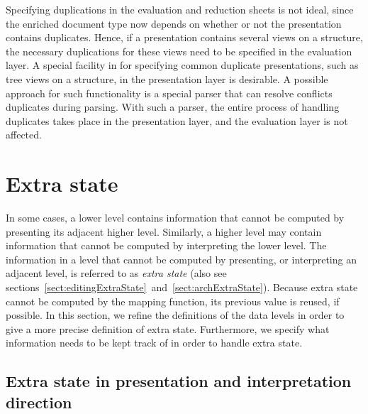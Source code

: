 Specifying duplications in the evaluation and reduction sheets is not ideal, since the enriched document type now depends on whether or not the presentation contains duplicates. Hence, if a presentation contains several views on a structure, the necessary duplications for these views need to be specified in the evaluation layer. A special facility in for specifying common duplicate presentations, such as tree views on a structure, in the presentation layer is desirable. A possible approach for such functionality is a special parser that can resolve conflicts duplicates during parsing. With such a parser, the entire process of handling duplicates takes place in the presentation layer, and the evaluation layer is not affected. 

%																
%																
%																
\section{Extra state} \label{sect:extraState}



In some cases, a lower level contains information that cannot be computed by presenting its adjacent higher level. Similarly, a higher level may contain information that cannot be computed by interpreting the lower level. The information in a level that cannot be computed by presenting, or interpreting an adjacent level, is referred to as {\em extra state} (also see sections~\ref{sect:editingExtraState}~and~\ref{sect:archExtraState}). Because extra state cannot be computed by the mapping function, its previous value is reused, if possible. In this section, we refine the definitions of the data levels in order to give a more precise definition of extra state. Furthermore, we specify what information needs to be kept track of in order to handle extra state.




%																
\subsection{Extra state in presentation and interpretation direction}

